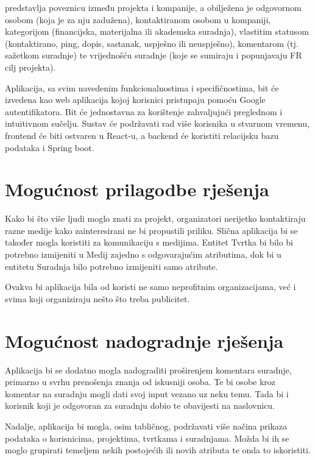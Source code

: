 		{ predstavlja poveznicu između projekta i kompanije, a obilježena je odgovornom osobom (koja je za nju zadužena), kontaktiranom osobom u kompaniji, kategorijom (financijska, materijalna ili akademska suradnja), vlastitim statusom (kontaktirano, ping, dopis, sastanak, uspješno ili neuspješno), komentarom (tj. sažetkom suradnje) te vrijednošću suradnje (koje se sumiraju i popunjavaju FR cilj projekta).}\vspace{0.3cm}

		{Aplikacija, sa svim navedenim funkcionalnostima i specifičnostima, bit će izvedena kao web aplikacija kojoj korisnici pristupaju pomoću Google autentifikatora. Bit će jednostavna za korištenje zahvaljujući preglednom i intuitivnom sučelju. Sustav će podržavati rad više korisnika u stvarnom vremenu, frontend će biti ostvaren u React-u, a backend će koristiti relacijsku bazu podataka i Spring boot.}
		
		
		\section{Mogućnost prilagodbe rješenja}
		
		{Kako bi što više ljudi moglo znati za projekt, organizatori nerijetko kontaktiraju razne medije kako zainteresirani ne bi propustili priliku. Slična aplikacija bi se također mogla koristiti za komunikaciju s medijima. Entitet Tvrtka bi bilo bi potrebno izmijeniti u Medij zajedno s odgovarajućim atributima, dok bi u entitetu Suradnja bilo potrebno izmijeniti samo atribute.}\vspace{0.1cm}
		
		{Ovakva bi aplikacija bila od koristi ne samo neprofitnim organizacijama, već i svima koji organiziraju nešto što treba publicitet.}
		
		\section{Mogućnost nadogradnje rješenja}
		
		{Aplikacija bi se dodatno mogla nadograditi proširenjem komentara suradnje, primarno u svrhu prenošenja znanja od iskusniji osoba. Te bi osobe kroz komentar na suradnju mogli dati svoj input vezano uz neku temu. Tada bi i korisnik koji je odgovoran za suradnju dobio te obavijesti na naslovnicu.}\vspace{0.1cm}
		
		{Nadalje, aplikacija bi mogla, osim tabličnog, podržavati više načina prikaza podataka o korisnicima, projektima, tvrtkama i suradnjama. Možda bi ih se moglo grupirati temeljem nekih postojećih ili novih atributa te onda to iskoristiti.}\vspace{0.1cm}
		
